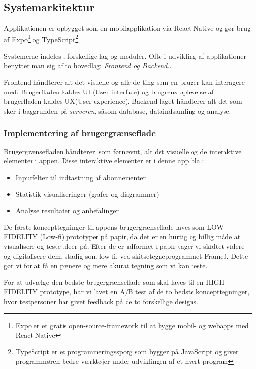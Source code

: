 \subsection{Systemarkitektur}

Applikationen er opbygget som en mobilapplikation via React Native og gør brug af Expo\footnote{Expo er et gratis open-source-framework til at bygge mobil- og webapps med React Native} og TypeScript\footnote{TypeScript er et programmeringssporg som bygger på JavaScript og giver programmøren bedre værktøjer under udviklingen af et hvert program}

Systemerne indeles i forskellige lag og moduler. Ofte i udvikling af applikationer benytter man sig af to hovedlag: \textit{Frontend og Backend.}. 

Frontend håndterer alt det visuelle og alle de ting som en bruger kan interagere med. Brugerfladen kaldes UI (User interface) og brugrens oplevelse af brugerfladen kaldes UX(User experience). Backend-laget håndterer alt det som sker i baggrunden på \textit{serveren}, såsom  database, dataindsamling og analyse.

\subsubsection{Implementering af brugergrænseflade}
Brugergrænsefladen håndterer, som førnævnt, alt det visuelle og de interaktive elementer i appen. Disse interaktive elementer er i denne app bla.:

\begin{itemize}
    \item Inputfelter til indtastning af abonnementer
    \item Statistik visualiseringer (grafer og diagrammer)
    \item Analyse resultater og anbefalinger
\end{itemize}

De første koncepttegninger til appens brugergrænseflade laves som LOW-FIDELITY (Low-fi) prototyper på papir, da det er en hurtig og billig måde at visualisere og teste ideer på. Efter de er udformet i papir tager vi skidtet videre og digitalisere dem, stadig som low-fi, ved skitsetegneprogrammet Frame0. Dette gør vi for at få en pænere og mere akurat tegning som vi kan teste.

For at udvælge den bedste brugergrænseflade som skal laves til en HIGH-FIDELITY prototype, har vi lavet en A/B test af de to bedste koncepttegninger, hvor testpersoner har givet feedback på de to forskellige designs.

